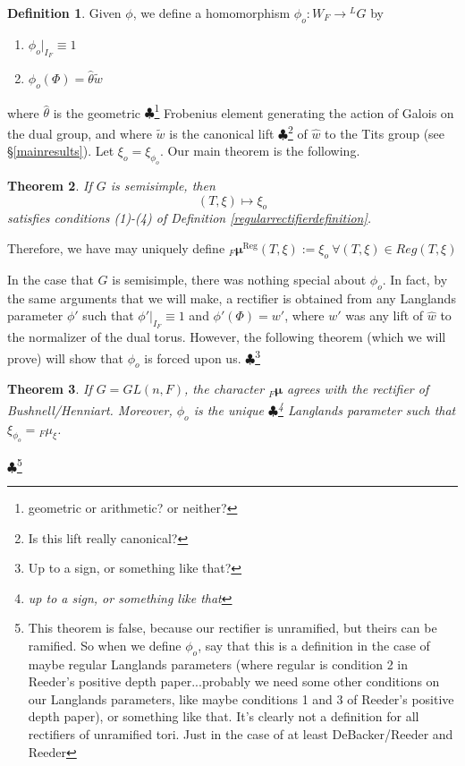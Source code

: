 \documentclass[11pt]{amsart}
\theoremstyle{plain}
\newtheorem{theorem}{Theorem}[section]
\newcommand{\MAxxx}[1]{$\clubsuit$\footnote{#1}}
\theoremstyle{definition}
\newtheorem{definition}[theorem]{Definition}
\begin{document}
\begin{definition}
Given $\phi$, we define a homomorphism $\phi_o : W_F \rightarrow {}^L G$ by
\begin{enumerate}
\item $\phi_o|_{I_F} \equiv 1$
\item $\phi_o(\Phi) = \hat{\theta} \tilde{w}$
\end{enumerate}
\end{definition}

where $\hat{\theta}$ is the geometric
\MAxxx{geometric or arithmetic? or neither?}
Frobenius element generating the action of Galois on
the dual group, and where $\tilde{w}$ is the canonical lift
\MAxxx{Is this lift really canonical?}
of $\hat{w}$ to the Tits group (see \S\ref{mainresults}).
Let $\xi_o = \xi_{\phi_o}$.  Our main theorem is the following.

\begin{theorem}
  If $G$ is semisimple, then $$(T, \xi) \mapsto
  \xi_o$$ satisfies conditions (1)-(4) of Definition \ref{regularrectifierdefinition}.
\end{theorem}

Therefore, we have may uniquely define 
${}_F \boldsymbol\mu^{\mathrm{Reg}}(T,\xi) 
:= \xi_o \ \forall (T,\xi) \in Reg(T,\xi)$

In the case that $G$ is semisimple, there was nothing special about
$\phi_o$.  In fact, by the same arguments that we will make, a
rectifier is obtained from any Langlands parameter $\phi'$ such that
$\phi'|_{I_F} \equiv 1$ and $\phi'(\Phi) = w'$, where $w'$ was any
lift of $\hat{w}$ to the normalizer of the dual torus.  However, the
following theorem (which we will prove) will show that $\phi_o$ is
forced upon us.
\MAxxx{Up to a sign, or something like that?}

\begin{theorem}
  If $G = GL(n,F)$, the character ${}_F \boldsymbol\mu$ agrees with
  the rectifier of Bushnell/Henniart.  Moreover, $\phi_o$ is the
  unique \MAxxx{up to a sign, or something like that} Langlands
  parameter such that $\xi_{\phi_o} = {}_F \mu_{\xi}$.
\end{theorem}\MAxxx{This theorem is false, because our rectifier is unramified, but theirs can be ramified.
So when we define $\phi_o$, say that this is a definition in the case of maybe regular Langlands parameters
(where regular is condition 2 in Reeder's positive depth paper...probably we need some other conditions on
our Langlands parameters, like maybe conditions 1 and 3 of Reeder's positive depth paper), or something like
that. It's clearly not a definition for all rectifiers of unramified tori. Just in the case of at least
DeBacker/Reeder and Reeder}
\end{document}
